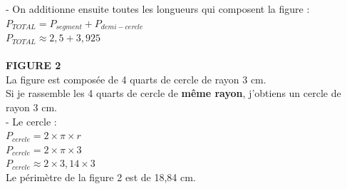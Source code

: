 \documentclass[a4paper,11pt]{article}
\begin{document}
- On additionne ensuite toutes les longueurs qui composent la figure :\\

$P_{TOTAL} = P_{segment} + P_{demi-cercle} $\\

$P_{TOTAL} \approx 2,5 + 3,925 $\\

 \\

\textbf{FIGURE 2} \\
La figure est composée de 4 quarts de cercle de rayon 3 cm.\\
Si je rassemble les 4 quarts de cercle de \textbf{même rayon}, j'obtiens un cercle de rayon 3 cm.\\



- Le   cercle : \\


$P_{cercle} = 2 \times \pi \times r $\\

$P_{cercle} = 2 \times \pi \times 3 $\\

$P_{cercle} \approx 2 \times 3,14 \times 3 $\\

 \hspace*{1cm} Le périmètre de la figure 2 est de 18,84 cm.\\


\color{black}
\end{document}
